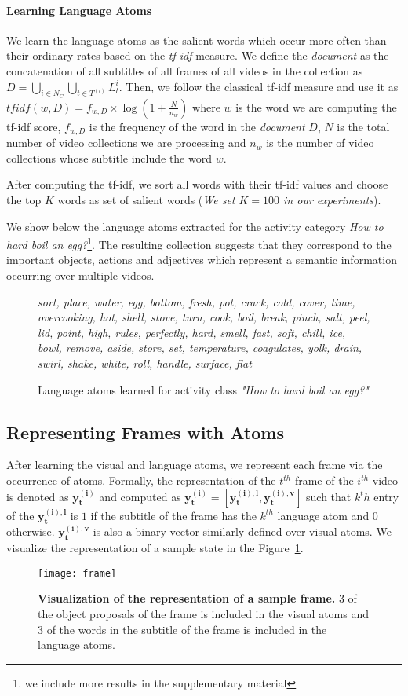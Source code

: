 \paragraph{Learning Language Atoms}
We learn the language atoms as the salient words which occur more often than their ordinary rates based on the \emph{tf-idf} measure. We define the \emph{document} as the concatenation of all subtitles of all frames of all videos in the collection as $D=\bigcup_{i \in N_C} \bigcup_{t \in T^{(i)}} L_t^i$. Then, we follow the classical tf-idf measure and use it as $tfidf(w,D)=f_{w,D} \times \log \left( 1+ \frac{N}{n_{w}}\right)$ where $w$ is the word we are computing the tf-idf score, $f_{w,D}$ is the frequency of the word in the \emph{document} $D$, $N$ is the total number of video collections we are processing and $n_{w}$ is the number of video collections whose subtitle include the word $w$.

After computing the tf-idf, we sort all words with their tf-idf values and choose the top $K$ words as set of salient words (\emph{We set $K=100$ in our experiments}).

We show below the language atoms extracted for the activity category \emph{How to hard boil an egg?}\footnote{we include more results in the supplementary material}. The resulting collection suggests that they correspond to the important objects, actions and adjectives which represent a semantic information occurring over multiple videos.

\begin{figure}
\footnotesize
\emph{sort, place, water, egg, bottom, fresh, pot, crack, cold, cover, time, overcooking, hot, shell, stove, turn, cook, boil, break, pinch, salt, peel, lid, point, high, rules, perfectly, hard, smell, fast, soft, chill, ice, bowl, remove, aside, store, set, temperature, coagulates, yolk, drain, swirl, shake, white, roll, handle, surface, flat}
\normalsize
\caption{Language atoms learned for activity class \emph{"How to hard boil an egg?"}}
\end{figure}

\subsection{Representing Frames with Atoms}
After learning the visual and language atoms, we represent each frame via the occurrence of atoms. Formally, the representation of the $t^{th}$ frame of the $i^{th}$ video is denoted as $\mathbf{y^{(i)}_t}$ and computed as $\mathbf{y^{(i)}_t}=[\mathbf{y^{(i),l}_t},\mathbf{y^{(i),v}_t}]$ such that $k^th$ entry of the $\mathbf{y^{(i),l}_t}$ is $1$ if the subtitle of the frame has the $k^{th}$ language atom and $0$ otherwise. $\mathbf{y^{(i),v}_t}$ is also a binary vector similarly defined over visual atoms. We visualize the representation of a sample state in the Figure~\ref{visFrame}.
\begin{figure}[h!]
  \texttt{[image: frame]}
  \caption{\textbf{Visualization of the representation of a sample frame.} 3 of the object proposals of the frame is included in the visual atoms and 3 of the words in the subtitle of the frame is included in the language atoms.}
  \label{visFrame}
\end{figure}

